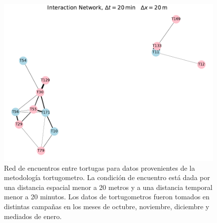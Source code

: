  
\begin{figure}[ht]
    \begin{center}
       
   
    \includegraphics[width=\imsize]{Chap2/red_interaccion_20min_campanas.pdf}
\end{center}
    \caption[Red de encuentros entre tortugas  con datos tomados por el tortugometro.]{Red de encuentros entre tortugas para datos provenientes de la metodología  tortugometro. La condición de encuentro está dada por una distancia espacial menor a 20 metros y a una distancia temporal menor a 20 minutos. Los datos de tortugometros fueron tomados en distintas campañas en los meses de octubre, noviembre, diciembre y mediados de enero.}
    \label{fig:redInteraccion20mincampanas}
\end{figure}
 
 
 
